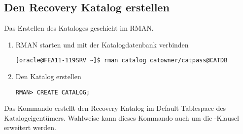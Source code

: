       \subsection{Den Recovery Katalog erstellen}
        Das Erstellen des Kataloges geschieht im RMAN.
        \begin{enumerate}
          \item RMAN starten und mit der Katalogdatenbank verbinden
            \begin{lstlisting}[caption={Mit der Katalogdatenbank verbinden},label=admin1205,language=rman,language=terminal]
[oracle@FEA11-119SRV ~]$ rman catalog catowner/catpass@CATDB
            \end{lstlisting}
          \item Den Katalog erstellen
            \begin{lstlisting}[caption={Katalog erstellen},label=admin1206,language=rman]
RMAN> CREATE CATALOG;
            \end{lstlisting}
        \end{enumerate}
        Das Kommando  erstellt den Recovery Katalog im Default Tablespace des Katalogeigent\"umers. Wahlweise kann dieses Kommando auch um die -Klausel erweitert werden.
